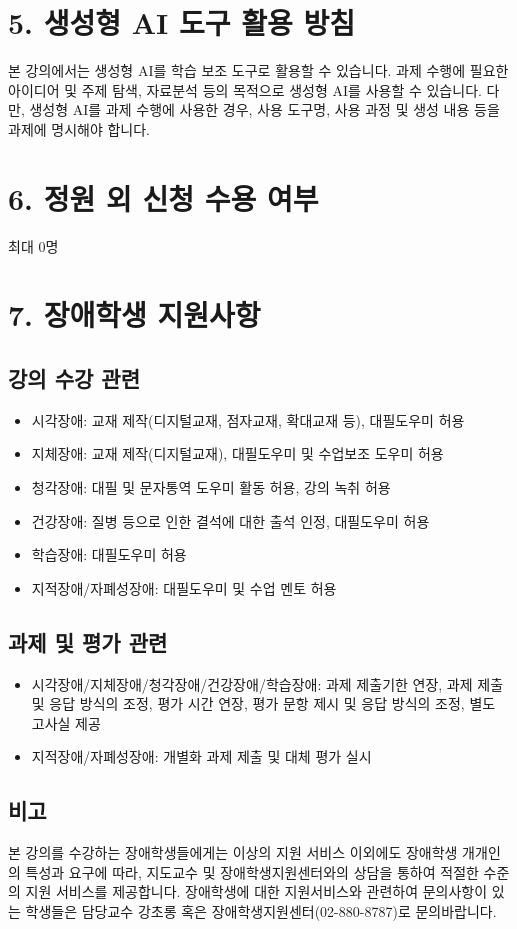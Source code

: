 \documentclass{article}
\begin{document}
\newpage
\section{5. 생성형 AI 도구 활용 방침}
\medskip
본 강의에서는 생성형 AI를 학습 보조 도구로 활용할 수 있습니다. 과제 수행에 필요한 아이디어 및 주제 탐색, 자료분석 등의 목적으로 생성형 AI를 사용할 수 있습니다. 다만, 생성형 AI를 과제 수행에 사용한 경우, 사용 도구명, 사용 과정 및 생성 내용 등을 과제에 명시해야 합니다.

\section{6. 정원 외 신청 수용 여부}
\medskip
최대 0명

\section{7. 장애학생 지원사항}
\medskip
\subsection{강의 수강 관련}
\medskip
\begin{itemize}
    \item 시각장애: 교재 제작(디지털교재, 점자교재, 확대교재 등), 대필도우미 허용
    \item 지체장애: 교재 제작(디지털교재), 대필도우미 및 수업보조 도우미 허용
    \item 청각장애: 대필 및 문자통역 도우미 활동 허용, 강의 녹취 허용
    \item 건강장애: 질병 등으로 인한 결석에 대한 출석 인정, 대필도우미 허용
    \item 학습장애: 대필도우미 허용
    \item 지적장애/자폐성장애: 대필도우미 및 수업 멘토 허용
\end{itemize}
\subsection{과제 및 평가 관련}
\medskip
\begin{itemize}
    \item 시각장애/지체장애/청각장애/건강장애/학습장애: 과제 제출기한 연장, 과제 제출 및 응답 방식의 조정, 평가 시간 연장, 평가 문항 제시 및 응답 방식의 조정, 별도 고사실 제공
    \item 지적장애/자폐성장애: 개별화 과제 제출 및 대체 평가 실시
\end{itemize}
\subsection{비고}
\medskip
본 강의를 수강하는 장애학생들에게는 이상의 지원 서비스 이외에도 장애학생 개개인의 특성과 요구에 따라, 지도교수 및 장애학생지원센터와의 상담을 통하여 적절한 수준의 지원 서비스를 제공합니다. 장애학생에 대한 지원서비스와 관련하여 문의사항이 있는 학생들은 담당교수 강초롱 혹은 장애학생지원센터(02-880-8787)로 문의바랍니다.
\end{document}
